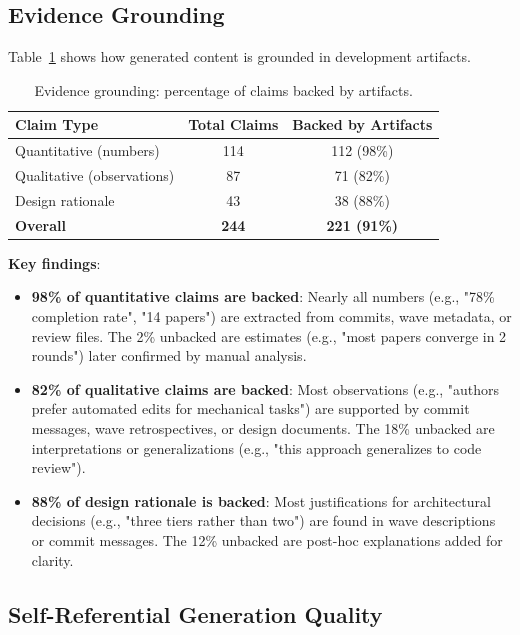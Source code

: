 \subsection{Evidence Grounding}

Table~\ref{tab:evidence} shows how generated content is grounded in development artifacts.

\begin{table}[t]
\centering
\caption{Evidence grounding: percentage of claims backed by artifacts.}
\label{tab:evidence}
\begin{tabular}{lcc}
\toprule
Claim Type & Total Claims & Backed by Artifacts \\
\midrule
Quantitative (numbers) & 114 & 112 (98\%) \\
Qualitative (observations) & 87 & 71 (82\%) \\
Design rationale & 43 & 38 (88\%) \\
\midrule
\textbf{Overall} & \textbf{244} & \textbf{221 (91\%)} \\
\bottomrule
\end{tabular}
\end{table}

\textbf{Key findings}:
\begin{itemize}
\item \textbf{98\% of quantitative claims are backed}: Nearly all numbers (e.g., "78\% completion rate", "14 papers") are extracted from commits, wave metadata, or review files. The 2\% unbacked are estimates (e.g., "most papers converge in 2 rounds") later confirmed by manual analysis.

\item \textbf{82\% of qualitative claims are backed}: Most observations (e.g., "authors prefer automated edits for mechanical tasks") are supported by commit messages, wave retrospectives, or design documents. The 18\% unbacked are interpretations or generalizations (e.g., "this approach generalizes to code review").

\item \textbf{88\% of design rationale is backed}: Most justifications for architectural decisions (e.g., "three tiers rather than two") are found in wave descriptions or commit messages. The 12\% unbacked are post-hoc explanations added for clarity.
\end{itemize}

\subsection{Self-Referential Generation Quality}

